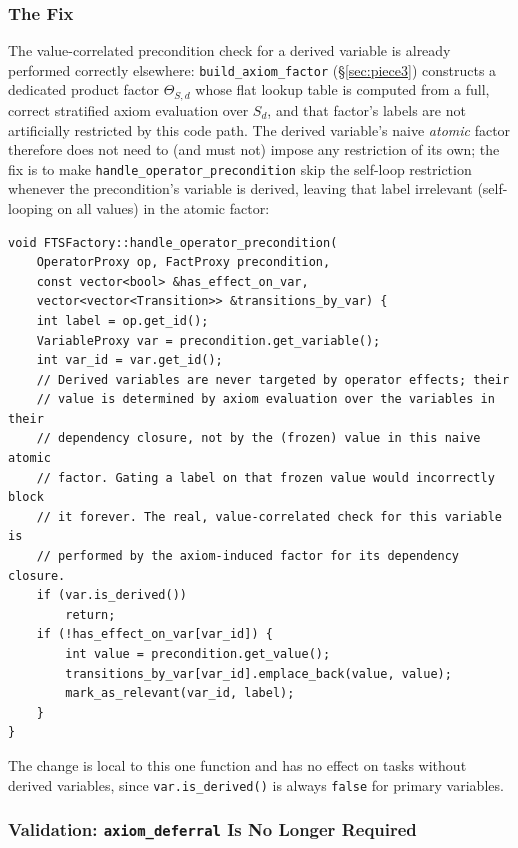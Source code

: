 \documentclass[11pt,a4paper]{article}
\begin{document}
\subsubsection{The Fix}

The value-correlated precondition check for a derived variable is already
performed correctly elsewhere: \texttt{build\_axiom\_factor}
(\S\ref{sec:piece3}) constructs a dedicated product factor
$\Theta_{S,d}$ whose flat lookup table is computed from a full,
correct stratified axiom evaluation over $S_d$, and that factor's labels are
not artificially restricted by this code path. The derived variable's naive
\emph{atomic} factor therefore does not need to (and must not) impose any
restriction of its own; the fix is to make
\texttt{handle\_operator\_precondition} skip the self-loop restriction
whenever the precondition's variable is derived, leaving that label
irrelevant (self-looping on all values) in the atomic factor:
\begin{lstlisting}
void FTSFactory::handle_operator_precondition(
    OperatorProxy op, FactProxy precondition,
    const vector<bool> &has_effect_on_var,
    vector<vector<Transition>> &transitions_by_var) {
    int label = op.get_id();
    VariableProxy var = precondition.get_variable();
    int var_id = var.get_id();
    // Derived variables are never targeted by operator effects; their
    // value is determined by axiom evaluation over the variables in their
    // dependency closure, not by the (frozen) value in this naive atomic
    // factor. Gating a label on that frozen value would incorrectly block
    // it forever. The real, value-correlated check for this variable is
    // performed by the axiom-induced factor for its dependency closure.
    if (var.is_derived())
        return;
    if (!has_effect_on_var[var_id]) {
        int value = precondition.get_value();
        transitions_by_var[var_id].emplace_back(value, value);
        mark_as_relevant(var_id, label);
    }
}
\end{lstlisting}
The change is local to this one function and has no effect on tasks without
derived variables, since \texttt{var.is\_derived()} is always \texttt{false}
for primary variables.

\subsubsection{Validation: \texttt{axiom\_deferral} Is No Longer Required}
\end{document}
